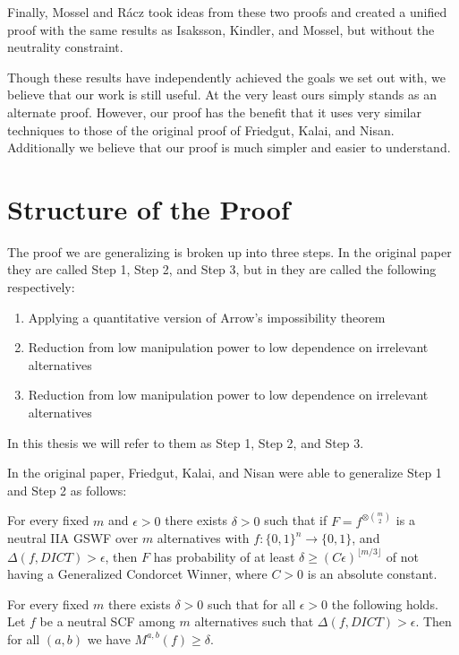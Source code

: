 	Finally, Mossel and R\'{a}cz \cite{mossel2011quantitative} took ideas from these two proofs and created a unified proof with the same results as Isaksson, Kindler, and Mossel, but without the neutrality constraint.

	Though these results have independently achieved the goals we set out with, we believe that our work is still useful. At the very least ours simply stands as an alternate proof. However, our proof has the benefit that it uses very similar techniques to those of the original proof of Friedgut, Kalai, and Nisan. Additionally we believe that our proof is much simpler and easier to understand.


\section {Structure of the Proof}

	The proof we are generalizing is broken up into three steps. In the original paper they are called Step 1, Step 2, and Step 3, but in \cite{friedgut2011quantitative} they are called the following respectively:
	\begin{enumerate}
		\item Applying a quantitative version of Arrow's impossibility theorem
		\item Reduction from low manipulation power to low dependence on irrelevant alternatives
		\item Reduction from low manipulation power to low dependence on irrelevant alternatives
	\end{enumerate}
	In this thesis we will refer to them as Step 1, Step 2, and Step 3.

	In the original paper, Friedgut, Kalai, and Nisan were able to generalize Step 1 and Step 2 as follows:

	\begin{lemma}
		For every fixed $m$ and $\epsilon > 0$ there exists $\delta > 0$ such that if $F = f^{\otimes \binom{m}{2}}$ is a neutral IIA GSWF over $m$ alternatives with $f : \{0,1\}^n \rightarrow \{0,1\}$, and $\Delta(f, DICT) > \epsilon$, then $F$ has probability of at least $\delta \ge (C\epsilon)^{\lfloor m/3 \rfloor}$ of not having a Generalized Condorcet Winner, where $C > 0$ is an absolute constant.
	\end{lemma}

	\begin{lemma}
		For every fixed $m$ there exists $\delta > 0$ such that for all $\epsilon > 0$ the following holds. Let $f$ be a neutral SCF among $m$ alternatives such that $\Delta(f, DICT) > \epsilon$. Then for all $(a,b)$ we have $M^{a,b}(f) \ge \delta$.
	\end{lemma}

